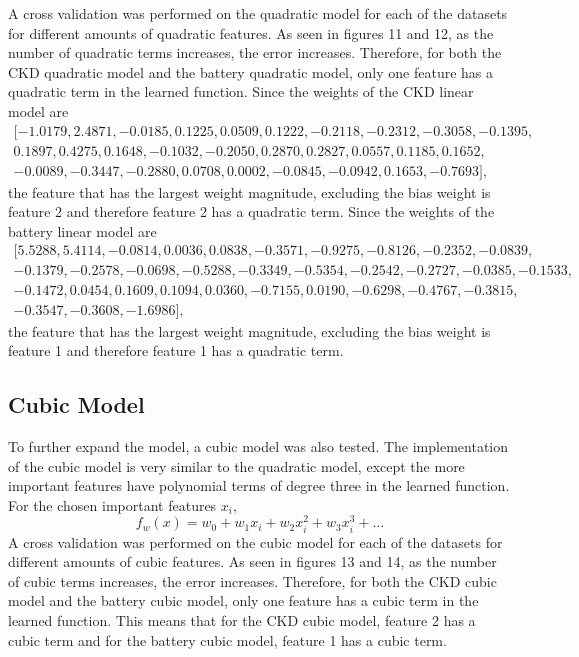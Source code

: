\documentclass{article}
\begin{document}
A cross validation was performed on the quadratic model for each of the datasets for different amounts of quadratic features.  As seen in figures 11 and 12, 
as the number of quadratic terms increases, the error increases.  Therefore, for both the CKD quadratic model and the battery quadratic model, only one feature has a quadratic term in the learned function.   
Since the weights of the CKD linear model are 
\begin{equation*}
  \begin{aligned}
    [-1.0179,  2.4871, -0.0185,  0.1225, 0.0509,  0.1222, -0.2118, -0.2312, -0.3058, -0.1395, \\
    0.1897,  0.4275,  0.1648, -0.1032, -0.2050,  0.2870,  0.2827,  0.0557, 0.1185,  0.1652, \\
    -0.0089, -0.3447, -0.2880,  0.0708, 0.0002, -0.0845, -0.0942,  0.1653, -0.7693],
  \end{aligned}
\end{equation*}
the feature that has the largest weight magnitude, excluding  the bias weight is feature 2 and therefore feature 2 has a quadratic term.   
Since the weights of the battery linear model are 
\begin{equation*}
  \begin{aligned}
    [5.5288, 5.4114, -0.0814, 0.0036, 0.0838, -0.3571, -0.9275, -0.8126, -0.2352, -0.0839, \\
    -0.1379, -0.2578, -0.0698, -0.5288, -0.3349, -0.5354, -0.2542, -0.2727, -0.0385, -0.1533, \\
    -0.1472, 0.0454, 0.1609, 0.1094, 0.0360, -0.7155, 0.0190, -0.6298, -0.4767, -0.3815, \\
    -0.3547, -0.3608, -1.6986],
  \end{aligned}
  \end{equation*}
the feature that has the largest weight magnitude, excluding the bias weight is feature 1 and therefore feature 1 has a quadratic term. 

\subsection{Cubic Model}

To further expand the model, a cubic model was also tested.   The implementation of the cubic model is very similar to the quadratic model, except the more important features have polynomial terms of degree three in the learned function.  For the chosen important features $x_i$,
\begin{equation}
  f_w (x) = w_0 + w_1 x_i + w_2 x^2_i + w_3 x^3_i + \dots
\end{equation}
A cross validation was performed on the cubic model for each of the datasets for different amounts of cubic features.  
As seen in figures 13 and 14, as the number of cubic terms increases, the error increases.  Therefore, for both the CKD cubic model and the battery cubic model, only one feature has a cubic term in the learned function.  
This means that for the CKD cubic model, feature 2 has a cubic term and for the battery cubic model, feature 1 has a cubic term. 
\end{document}

